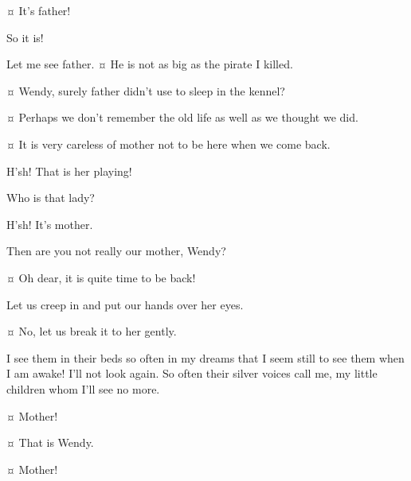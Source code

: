 \begin{drama}
\wendyspeaks {}¤
It’s father!

\johnspeaks
So it is!

\michaelspeaks
Let me see father.
¤
He is not as big as the pirate I killed.

\johnspeaks {}¤
Wendy, surely father didn’t use to sleep in the kennel?

\wendyspeaks {}¤
Perhaps we don’t remember the old life as well as we thought we did.

\johnspeaks {}¤
It is very careless of mother not to be here when we come back.


\wendyspeaks
H’sh!
That is her playing!

\michaelspeaks
Who is that lady?

\johnspeaks
H’sh!
It’s mother.

\michaelspeaks
Then are you not really our mother, Wendy?

\wendyspeaks {}¤
Oh dear, it is quite time to be back!

\johnspeaks
Let us creep in and put our hands over her eyes.

\wendyspeaks {}¤
No, let us break it to her gently.


\mrsdarlingspeaks
I see them in their beds so often in my dreams that I seem still to see them when I am awake!
I’ll not look again.
So often their silver voices call me, my little children whom I’ll see no more.


\wendyspeaks {}¤
Mother!

\mrsdarlingspeaks {}¤
That is Wendy.

\johnspeaks {}¤
Mother!


\end{drama}
